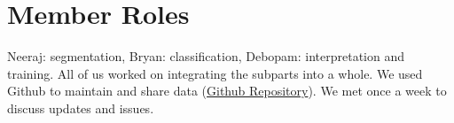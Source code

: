 \documentclass[10pt, twocolumn,letterpaper]{article}
\begin{document}
	\section{Member Roles}
	Neeraj: segmentation, Bryan: classification, Debopam: interpretation and training. All of us worked on integrating the subparts into a whole. We used Github to maintain and share data (\href{https://github.com/neerajgangwar/graph-recognition}{Github Repository}). We met once a week to discuss updates and issues.
	
	\printbibliography[title=References]
	
\end{document}
